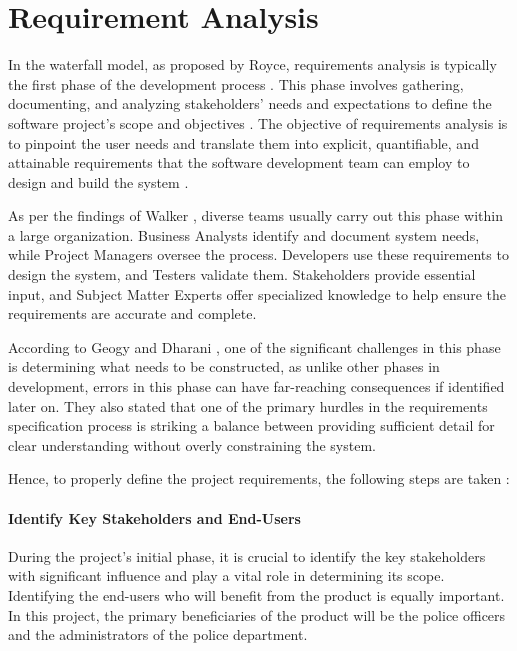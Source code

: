 \chapter{Requirement Analysis}
\label{chapter:requirement-analysis}

In the waterfall model, as proposed by Royce, requirements analysis is typically the first phase of the development process \cite{royce70}. This phase involves gathering, documenting, and analyzing stakeholders' needs and expectations to define the software project's scope and objectives \cite{Hausen}. The objective of requirements analysis is to pinpoint the user needs and translate them into explicit, quantifiable, and attainable requirements that the software development team can employ to design and build the system \cite{Walker_2023}.

As per the findings of Walker \cite{Walker_2023}, diverse teams usually carry out this phase within a large organization. Business Analysts identify and document system needs, while Project Managers oversee the process. Developers use these requirements to design the system, and Testers validate them. Stakeholders provide essential input, and Subject Matter Experts offer specialized knowledge to help ensure the requirements are accurate and complete.

According to Geogy and Dharani \cite{Geogy2016}, one of the significant challenges in this phase is determining what needs to be constructed, as unlike other phases in development, errors in this phase can have far-reaching consequences if identified later on. They also stated that one of the primary hurdles in the requirements specification process is striking a balance between providing sufficient detail for clear understanding without overly constraining the system.

Hence, to properly define the project requirements, the following steps are taken \cite{Simplilearn_2023}:

\subsubsection{Identify Key Stakeholders and End-Users}
During the project's initial phase, it is crucial to identify the key stakeholders with significant influence and play a vital role in determining its scope. Identifying the end-users who will benefit from the product is equally important. In this project, the primary beneficiaries of the product will be the police officers and the administrators of the police department.

